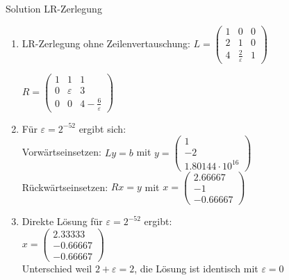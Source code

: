 \begin{KR}{Solution LR-Zerlegung}
\begin{enumerate}
    \item LR-Zerlegung ohne Zeilenvertauschung:
    $L = \begin{pmatrix}
    1 & 0 & 0\\
    2 & 1 & 0\\
    4 & \frac{2}{\varepsilon} & 1
    \end{pmatrix}$
    
    $R = \begin{pmatrix}
    1 & 1 & 1\\
    0 & \varepsilon & 3\\
    0 & 0 & 4-\frac{6}{\varepsilon}
    \end{pmatrix}$
    
    \item Für $\varepsilon = 2^{-52}$ ergibt sich:\\
    Vorwärtseinsetzen: $Ly = b$ mit $y = \begin{pmatrix}1\\-2\\1.80144\cdot 10^{16}\end{pmatrix}$\\
    Rückwärtseinsetzen: $Rx = y$ mit $x = \begin{pmatrix}2.66667\\-1\\-0.66667\end{pmatrix}$
    
    \item Direkte Lösung für $\varepsilon = 2^{-52}$ ergibt:\\
    $x = \begin{pmatrix}2.33333\\-0.66667\\-0.66667\end{pmatrix}$\\
    Unterschied weil $2 + \varepsilon = 2$, die Lösung ist identisch mit $\varepsilon = 0$
\end{enumerate}
\end{KR}

